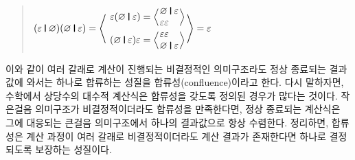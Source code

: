 \begin{quote}
\(
(\varepsilon\VERT \varnothing)(\varnothing\VERT \varepsilon) =
\left<\phantom{\begin{array}{l}.\\[4ex].\end{array}}\hspace*{-4ex}\right.
\begin{array}{l}
  \varepsilon(\varnothing\VERT \varepsilon) =
     \Big<\hspace*{-1ex}
     \begin{array}{l}
       \varnothing\VERT \varepsilon \\
       \varepsilon\varepsilon
     \end{array}\hspace*{-1ex}
     \Big>
  \\[1ex]
  (\varnothing\VERT \varepsilon)\varepsilon =
     \Big\langle\hspace*{-1ex}
     \begin{array}{l}
      \varepsilon\varepsilon  \\
      \varnothing\VERT \varepsilon
     \end{array}\hspace*{-1ex}
     \Big>
\end{array}
\left.\phantom{\begin{array}{l}.\\[4ex].\end{array}}\hspace*{-4.5ex}\right>
= \varepsilon
\)
\end{quote}
이와 같이 여러 갈래로 계산이 진행되는 비결정적인 의미구조라도
정상 종료되는 결과값에 와서는 하나로 합류하는 성질을
합류성(confluence)이라고 한다. 다시 말하자면, 수학에서 상당수의
대수적 계산식은 합류성을 갖도록 정의된 경우가 많다는 것이다.
작은걸음 의미구조가 비결정적이더라도 합류성을 만족한다면,
정상 종료되는 계산식은 그에 대응되는 큰걸음 의미구조에서
하나의 결과값으로 항상 수렴한다. 정리하면, 합류성은 계산 과정이
여러 갈래로 비결정적이더라도 계산 결과가 존재한다면 하나로
결정되도록 보장하는 성질이다.


